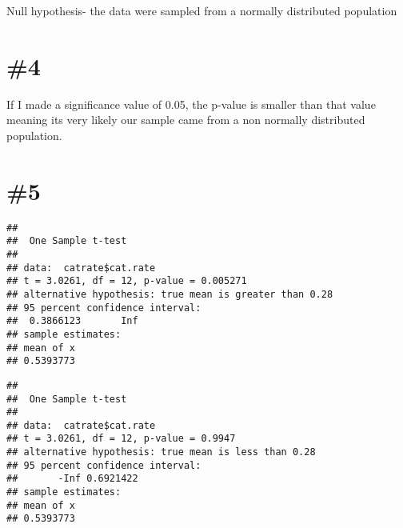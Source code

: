 \documentclass[
]{article}
\newenvironment{Shaded}{\begin{snugshade}}{\end{snugshade}}
\newcommand{\AttributeTok}[1]{\textcolor[rgb]{0.77,0.63,0.00}{#1}}
\newcommand{\FloatTok}[1]{\textcolor[rgb]{0.00,0.00,0.81}{#1}}
\newcommand{\FunctionTok}[1]{\textcolor[rgb]{0.00,0.00,0.00}{#1}}
\newcommand{\NormalTok}[1]{#1}
\newcommand{\SpecialCharTok}[1]{\textcolor[rgb]{0.00,0.00,0.00}{#1}}
\newcommand{\StringTok}[1]{\textcolor[rgb]{0.31,0.60,0.02}{#1}}
\begin{document}
Null hypothesis- the data were sampled from a normally distributed
population

\hypertarget{section-3}{%
\section{\#4}\label{section-3}}

If I made a significance value of 0.05, the p-value is smaller than that
value meaning its very likely our sample came from a non normally
distributed population.

\hypertarget{section-4}{%
\section{\#5}\label{section-4}}

\begin{Shaded}
\end{Shaded}

\begin{verbatim}
## 
##  One Sample t-test
## 
## data:  catrate$cat.rate
## t = 3.0261, df = 12, p-value = 0.005271
## alternative hypothesis: true mean is greater than 0.28
## 95 percent confidence interval:
##  0.3866123       Inf
## sample estimates:
## mean of x 
## 0.5393773
\end{verbatim}

\begin{Shaded}
\end{Shaded}

\begin{verbatim}
## 
##  One Sample t-test
## 
## data:  catrate$cat.rate
## t = 3.0261, df = 12, p-value = 0.9947
## alternative hypothesis: true mean is less than 0.28
## 95 percent confidence interval:
##       -Inf 0.6921422
## sample estimates:
## mean of x 
## 0.5393773
\end{verbatim}
\end{document}
